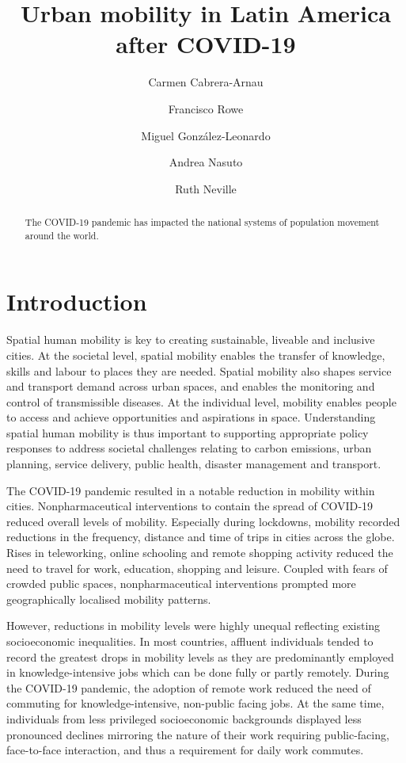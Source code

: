 \documentclass[
  11pt,
]{article}
\title{\textbf{Urban mobility in Latin America after COVID-19}}
\author[1]{Carmen Cabrera-Arnau}
\author[1]{Francisco Rowe}
\author[2]{Miguel González-Leonardo}
\author[1]{Andrea Nasuto}
\author[1]{Ruth Neville}
\affil[1]{Geographic Data Science Lab, Department of Geography and
Planning, University of Liverpool, Liverpool, UK}
\affil[2]{Centre for Demographic Urban and Environmental Studies, El
Colegio de México, Ciudad de México, México}
\date{}
\begin{document}
\maketitle
\begin{abstract}
The COVID‐19 pandemic has impacted the national systems of population
movement around the world.
\end{abstract}
\ifdefined\Shaded\renewenvironment{Shaded}{\begin{tcolorbox}[borderline west={3pt}{0pt}{shadecolor}, frame hidden, interior hidden, enhanced, breakable, sharp corners, boxrule=0pt]}{\end{tcolorbox}}\fi

\hypertarget{sec-intro}{%
\section{Introduction}\label{sec-intro}}

Spatial human mobility is key to creating sustainable, liveable and
inclusive cities. At the societal level, spatial mobility enables the
transfer of knowledge, skills and labour to places they are needed.
Spatial mobility also shapes service and transport demand across urban
spaces, and enables the monitoring and control of transmissible
diseases. At the individual level, mobility enables people to access and
achieve opportunities and aspirations in space. Understanding spatial
human mobility is thus important to supporting appropriate policy
responses to address societal challenges relating to carbon emissions,
urban planning, service delivery, public health, disaster management and
transport.

The COVID-19 pandemic resulted in a notable reduction in mobility within
cities. Nonpharmaceutical interventions to contain the spread of
COVID‐19 reduced overall levels of mobility. Especially during
lockdowns, mobility recorded reductions in the frequency, distance and
time of trips in cities across the globe. Rises in teleworking, online
schooling and remote shopping activity reduced the need to travel for
work, education, shopping and leisure. Coupled with fears of crowded
public spaces, nonpharmaceutical interventions prompted more
geographically localised mobility patterns.

However, reductions in mobility levels were highly unequal reflecting
existing socioeconomic inequalities. In most countries, affluent
individuals tended to record the greatest drops in mobility levels as
they are predominantly employed in knowledge-intensive jobs which can be
done fully or partly remotely. During the COVID-19 pandemic, the
adoption of remote work reduced the need of commuting for
knowledge-intensive, non-public facing jobs. At the same time,
individuals from less privileged socioeconomic backgrounds displayed
less pronounced declines mirroring the nature of their work requiring
public-facing, face-to-face interaction, and thus a requirement for
daily work commutes.
\end{document}
